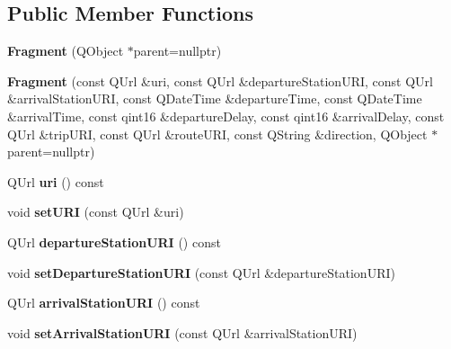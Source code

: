 \subsection*{Public Member Functions}
\begin{DoxyCompactItemize}
\item 
\mbox{\label{classFragments_1_1Fragment_a08e16b988d340a5e836c377a13e1c41d}} 
{\bfseries Fragment} (Q\+Object $\ast$parent=nullptr)
\item 
\mbox{\label{classFragments_1_1Fragment_a26ec3793c4162b77e92498a77ae5b7dc}} 
{\bfseries Fragment} (const Q\+Url \&uri, const Q\+Url \&departure\+Station\+U\+RI, const Q\+Url \&arrival\+Station\+U\+RI, const Q\+Date\+Time \&departure\+Time, const Q\+Date\+Time \&arrival\+Time, const qint16 \&departure\+Delay, const qint16 \&arrival\+Delay, const Q\+Url \&trip\+U\+RI, const Q\+Url \&route\+U\+RI, const Q\+String \&direction, Q\+Object $\ast$parent=nullptr)
\item 
\mbox{\label{classFragments_1_1Fragment_a8123bbbb75221107730898627b99ffec}} 
Q\+Url {\bfseries uri} () const
\item 
\mbox{\label{classFragments_1_1Fragment_ab4ad3107834caa289cfbed904f052fc0}} 
void {\bfseries set\+U\+RI} (const Q\+Url \&uri)
\item 
\mbox{\label{classFragments_1_1Fragment_aaca4de063cdd1df3f130ade1a0df8dfa}} 
Q\+Url {\bfseries departure\+Station\+U\+RI} () const
\item 
\mbox{\label{classFragments_1_1Fragment_a8c9ffce21e97be8e50e2ca1654da507f}} 
void {\bfseries set\+Departure\+Station\+U\+RI} (const Q\+Url \&departure\+Station\+U\+RI)
\item 
\mbox{\label{classFragments_1_1Fragment_a74d2fae0d687f2389121fb720f8f6505}} 
Q\+Url {\bfseries arrival\+Station\+U\+RI} () const
\item 
\mbox{\label{classFragments_1_1Fragment_af18c29375ad402d4ec02133fb5534a8e}} 
void {\bfseries set\+Arrival\+Station\+U\+RI} (const Q\+Url \&arrival\+Station\+U\+RI)

\end{DoxyCompactItemize}
